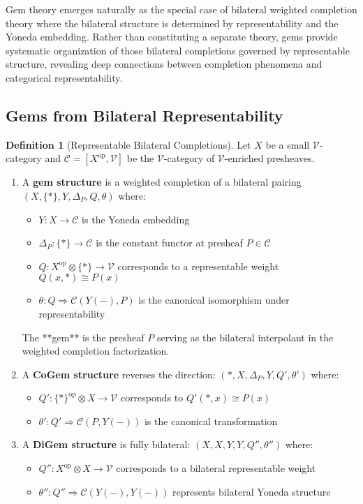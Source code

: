\documentclass[11pt]{article}
\theoremstyle{plain}
\theoremstyle{definition}
\newtheorem{definition}[theorem]{Definition}
\theoremstyle{remark}
\newcommand{\V}{\mathcal{V}}
\newcommand{\C}{\mathcal{C}}
\newcommand{\op}{\mathrm{op}}
\begin{document}
Gem theory emerges naturally as the special case of bilateral weighted completion theory where the bilateral structure is determined by representability and the Yoneda embedding. Rather than constituting a separate theory, gems provide systematic organization of those bilateral completions governed by representable structure, revealing deep connections between completion phenomena and categorical representability.

\subsection{Gems from Bilateral Representability}

\begin{definition}[Representable Bilateral Completions]\label{def:gems}
Let $X$ be a small $\V$-category and $\C = [X^{\op}, \V]$ be the $\V$-category of $\V$-enriched presheaves.

\begin{enumerate}
\item A \textbf{gem structure} is a weighted completion of a bilateral pairing $(X, \{\ast\}, Y, \Delta_P, Q, \theta)$ where:
\begin{itemize}
\item $Y : X \to \C$ is the Yoneda embedding
\item $\Delta_P : \{\ast\} \to \C$ is the constant functor at presheaf $P \in \C$
\item $Q : X^{\op} \otimes \{\ast\} \to \V$ corresponds to a representable weight $Q(x, \ast) \cong P(x)$
\item $\theta : Q \Rightarrow \C(Y(-), P)$ is the canonical isomorphism under representability
\end{itemize}

The **gem** is the presheaf $P$ serving as the bilateral interpolant in the weighted completion factorization.

\item A \textbf{CoGem structure} reverses the direction: $({\ast}, X, \Delta_P, Y, Q', \theta')$ where:
\begin{itemize}
\item $Q' : \{\ast\}^{\op} \otimes X \to \V$ corresponds to $Q'(\ast, x) \cong P(x)$
\item $\theta' : Q' \Rightarrow \C(P, Y(-))$ is the canonical transformation
\end{itemize}

\item A \textbf{DiGem structure} is fully bilateral: $(X, X, Y, Y, Q'', \theta'')$ where:
\begin{itemize}
\item $Q'' : X^{\op} \otimes X \to \V$ corresponds to a bilateral representable weight
\item $\theta'' : Q'' \Rightarrow \C(Y(-), Y(-))$ represents bilateral Yoneda structure
\end{itemize}
\end{enumerate}
\end{definition}
\end{document}
